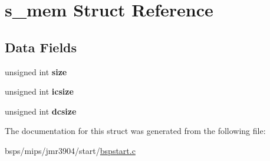 \hypertarget{structs__mem}{}\section{s\+\_\+mem Struct Reference}
\label{structs__mem}
\subsection*{Data Fields}
\begin{DoxyCompactItemize}
\item 
\mbox{\label{structs__mem_a1a0dc81f573e0627e51fd8119968c363}} 
unsigned int {\bfseries size}
\item 
\mbox{\label{structs__mem_ab790bc6cc4cae7fdf003dd482bdb27d1}} 
unsigned int {\bfseries icsize}
\item 
\mbox{\label{structs__mem_ae9f3602d1b9f40181864d30a6f5e779b}} 
unsigned int {\bfseries dcsize}
\end{DoxyCompactItemize}


The documentation for this struct was generated from the following file\+:\begin{DoxyCompactItemize}
\item 
bsps/mips/jmr3904/start/\mbox{\hyperlink{mips_2jmr3904_2start_2bspstart_8c}{bspstart.\+c}}\end{DoxyCompactItemize}
